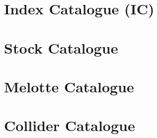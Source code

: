 \documentclass[10pt,twoside,a4paper,english]{article}
\begin{document}
\section{Index Catalogue (IC)}

\vspace{4 mm}

\vspace{4 mm}

\vspace{4 mm}

\vspace{4 mm}

\vspace{4 mm}

\vspace{4 mm}

\vspace{4 mm}
\clearpage
\section{Stock Catalogue}

\vspace{4 mm}

\vspace{4 mm}
\clearpage
\section{Melotte Catalogue}

\vspace{4 mm}

\vspace{4 mm}

\vspace{4 mm}
\clearpage
\section{Collider Catalogue}

\vspace{4 mm}

\vspace{4 mm}

\vspace{4 mm}

\vspace{4 mm}

\vspace{4 mm}

\vspace{4 mm}

\vspace{4 mm}

\vspace{4 mm}

\vspace{4 mm}
\clearpage
\end{document}
